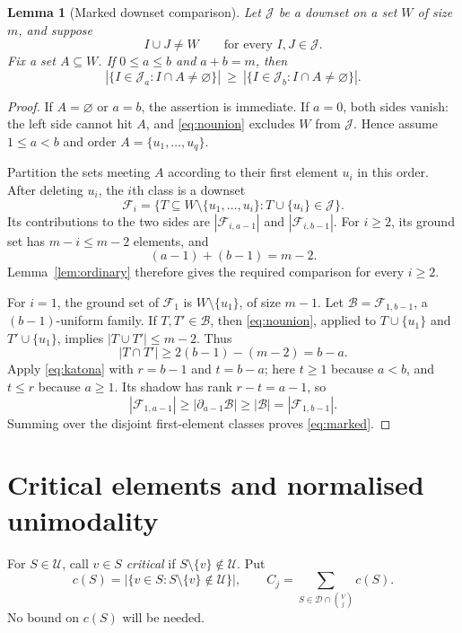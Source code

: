 \documentclass[11pt,a4paper]{article}
\newtheorem{lemma}[theorem]{Lemma}
\theoremstyle{remark}
\newcommand{\U}{\mathcal U}
\newcommand{\J}{\mathcal J}
\newcommand{\F}{\mathcal F}
\newcommand{\D}{\mathcal D}
\begin{document}
\begin{lemma}[Marked downset comparison]\label{lem:marked}
Let $\J$ be a downset on a set $W$ of size $m$, and suppose
\begin{equation}\label{eq:nounion}
I\cup J\ne W\qquad\text{for every }I,J\in\J.
\end{equation}
Fix a set $A\subseteq W$. If $0\leq a\leq b$ and $a+b=m$, then
\begin{equation}\label{eq:marked}
|\{I\in\J_a:I\cap A\ne\varnothing\}|
\ \geq\
|\{I\in\J_b:I\cap A\ne\varnothing\}|.
\end{equation}
\end{lemma}
\begin{proof}
If $A=\varnothing$ or $a=b$, the assertion is immediate. If $a=0$, both sides vanish: the left side cannot hit $A$, and \eqref{eq:nounion} excludes $W$ from $\J$. Hence assume $1\leq a<b$ and order $A=\{u_1,\ldots,u_q\}$.

Partition the sets meeting $A$ according to their first element $u_i$ in this order. After deleting $u_i$, the $i$th class is a downset
\[
\F_i=\{T\subseteq W\setminus\{u_1,\ldots,u_i\}:T\cup\{u_i\}\in\J\}.
\]
Its contributions to the two sides are $|\F_{i,a-1}|$ and $|\F_{i,b-1}|$. For $i\geq2$, its ground set has $m-i\leq m-2$ elements, and
\[
(a-1)+(b-1)=m-2.
\]
Lemma~\ref{lem:ordinary} therefore gives the required comparison for every $i\geq2$.

For $i=1$, the ground set of $\F_1$ is $W\setminus\{u_1\}$, of size $m-1$. Let $\mathcal B=\F_{1,b-1}$, a $(b-1)$-uniform family. If $T,T'\in\mathcal B$, then \eqref{eq:nounion}, applied to $T\cup\{u_1\}$ and $T'\cup\{u_1\}$, implies $|T\cup T'|\leq m-2$. Thus
\[
|T\cap T'|\geq2(b-1)-(m-2)=b-a.
\]
Apply \eqref{eq:katona} with $r=b-1$ and $t=b-a$; here $t\ge1$ because $a<b$, and $t\le r$ because $a\ge1$. Its shadow has rank $r-t=a-1$, so
\[
|\F_{1,a-1}|\geq|\partial_{a-1}\mathcal B|
\geq|\mathcal B|=|\F_{1,b-1}|.
\]
Summing over the disjoint first-element classes proves \eqref{eq:marked}.
\end{proof}

\section{Critical elements and normalised unimodality}

For $S\in\U$, call $v\in S$ \emph{critical} if $S\setminus\{v\}\notin\U$. Put
\[
c(S)=|\{v\in S:S\setminus\{v\}\notin\U\}|,
\qquad C_j=\sum_{S\in\D\cap\binom Vj}c(S).
\]
No bound on $c(S)$ will be needed.
\end{document}
